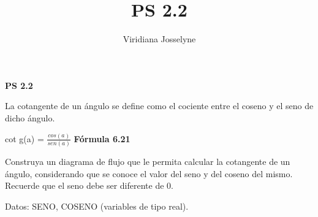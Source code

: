\documentclass[11pt]{amsart}
\title{PS 2.2}
\author{Viridiana Josselyne}
\begin{document}
\maketitle
\textbf{PS 2.2} \newline

La cotangente de un ángulo se define como el cociente entre el coseno y el seno de dicho ángulo.

\begin{center}

	cot g(a) = $ \frac{cos(a)}{sen(a)} $ \newline
	\newline
	\textbf{Fórmula 6.21} \newline

\end{center}  

Construya un diagrama de flujo que le permita calcular la cotangente de un ángulo, considerando que se conoce el valor del seno y del coseno del mismo. Recuerde que el seno debe ser diferente de 0. \newline

Datos: SENO, COSENO (variables de tipo real).
\end{document}
